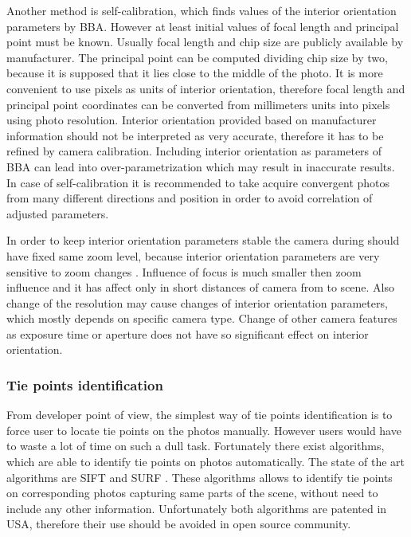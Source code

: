 \documentclass[a4paper,12pt]{article}
\begin{document}
Another method is self-calibration, which finds values of the interior orientation parameters by BBA.
However at least initial values of focal length and principal point must be known.
Usually focal length and chip size are publicly available by manufacturer. The principal point 
can be computed dividing chip size by two, because it is supposed that it lies close to 
the middle of the photo.
It is more convenient to use 
pixels as units of interior orientation, therefore focal length and principal point coordinates can be 
converted from millimeters units into pixels using photo resolution. 
Interior orientation provided based on manufacturer information should not be interpreted as very accurate, therefore 
it has  to be refined by camera calibration.
Including interior orientation as parameters of BBA
can lead into over-parametrization which may result in inaccurate results.
In case of self-calibration it is recommended to take acquire convergent photos from many different directions and position in order
to avoid correlation of adjusted parameters. 

In order to keep interior orientation parameters stable the camera during should have fixed same zoom level,
because interior orientation parameters are very sensitive  to zoom changes \cite{labe2004geometric}.
Influence of focus is  much smaller then zoom influence and it has affect only in short distances of camera
from to scene.
Also change of the resolution may cause changes of interior orientation parameters, which mostly depends 
on specific camera type. 
Change of other camera features as exposure time or aperture does not have so significant effect on interior
orientation.

\subsubsection{Tie points identification}

From developer point of view, the simplest way of tie points identification is to force user to locate tie points on 
the photos manually. However users would have to waste a lot of time on such a 
dull task. Fortunately there  exist algorithms, which are able to identify tie points on photos
automatically. The state of the art algorithms are SIFT \cite{wiki:SIFT} and SURF \cite{wiki:SURF}.
These algorithms allows to identify tie points on corresponding photos capturing same parts of the scene, without need to include any other information.
Unfortunately both algorithms are patented in USA, therefore their use should be avoided in open source community.
\end{document}
